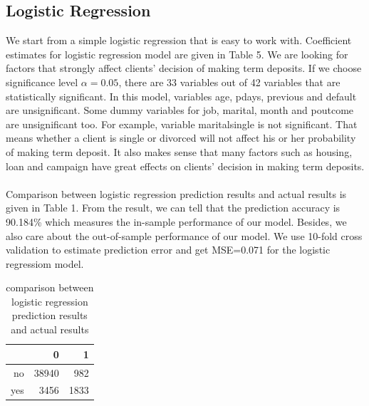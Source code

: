 \documentclass{article} %
\begin{document}
\subsection{Logistic Regression}

We start from a simple logistic regression that is easy to work with. Coefficient estimates for logistic regression model are given in Table 5. We are looking for factors that strongly affect clients' decision of making term deposits. If we choose significance level $\alpha=0.05$, there are 33 variables out of 42 variables that are statistically significant. In this model, variables age, pdays, previous and default are unsignificant. Some dummy variables for job, marital, month and poutcome are unsignificant too. For example, variable maritalsingle is not significant. That means whether a client is single or divorced will not affect his or her probability of making term deposit. It also makes sense that many factors such as housing, loan and campaign have great effects on clients' decision in making term deposits.\\\\
Comparison between logistic regression prediction results and actual results is given in Table 1. From the result, we can tell that the prediction accuracy is 90.184\% which measures the in-sample performance of our model. Besides, we also care about the out-of-sample performance of our model. We use 10-fold cross validation to estimate prediction error and get MSE=0.071 for the logistic regressiom model.
\begin{table}[ht]
\caption{comparison between logistic regression prediction results and actual results}
\centering
\begin{tabular}{rrr}
  \hline
 & 0 & 1 \\ 
  \hline
no & 38940 & 982 \\ 
  yes & 3456 & 1833 \\ 
   \hline
\end{tabular}
\end{table}
\end{document}
